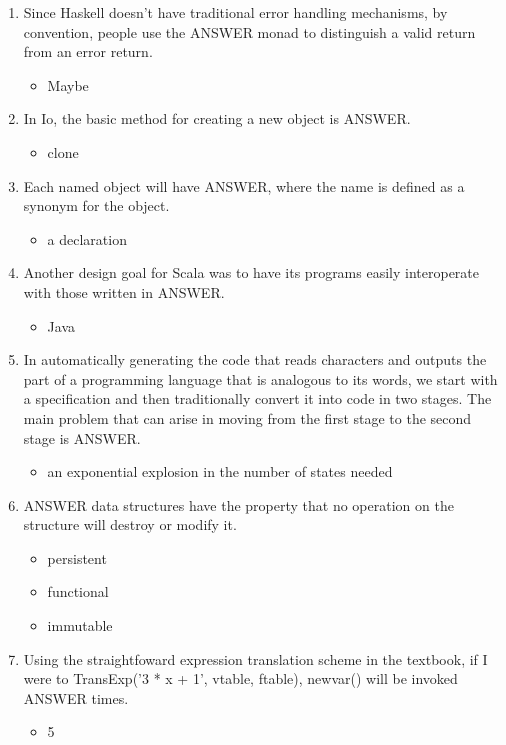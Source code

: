 \documentclass{exam}
\begin{document}
\begin{enumerate}
\begin{itemize}
\end{itemize}
\item Since Haskell doesn't have traditional error handling mechanisms, by convention, people use the ANSWER monad to distinguish a valid return from an error return.
\begin{itemize}
\item Maybe
\end{itemize}
\item In Io, the basic method for creating a new object is ANSWER.
\begin{itemize}
\item clone
\end{itemize}
\item Each named object will have ANSWER, where the name is defined as a synonym for the object.
\begin{itemize}
\item a declaration
\end{itemize}
\item Another design goal for Scala was to have its programs easily interoperate with those written in ANSWER.
\begin{itemize}
\item Java
\end{itemize}
\item In automatically generating the code that reads characters and outputs the part of a programming language that is analogous to its words, we start with a specification and then traditionally convert it into code in two stages.  The main problem that can arise in moving from the first stage to the second stage is ANSWER.
\begin{itemize}
\item an exponential explosion in the number of states needed
\end{itemize}
\item ANSWER data structures have the property that no operation on the structure will destroy or modify it.
\begin{itemize}
\item persistent
\item functional
\item immutable
\end{itemize}
\item Using the straightfoward expression translation scheme in the textbook, if I were to TransExp('3 * x + 1', vtable, ftable), newvar() will be invoked ANSWER times.
\begin{itemize}
\item 5

\end{itemize}
\end{enumerate}
\end{document}
